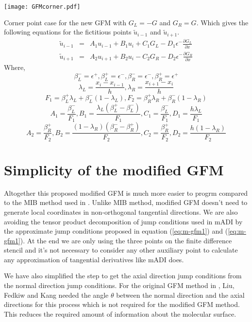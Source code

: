 \begin{center}
	\texttt{[image: GFMcorner.pdf]}\\		
\end{center}
		
Corner point case for the new GFM with $G_L=-G$ and $G_R = G$. 
Which gives the following equations for the fictitious points $\tilde{u}_{i-1}$ and $\tilde{u}_{i+1}$. 
	\begin{eqnarray}
		\tilde{u}_{i-1}&=& A_1 u_{i-1}+B_1 u_{i} + C_1 G_L- D_1 \epsilon^- \frac{\partial G_L}{\partial x} \\
		\tilde{u}_{i+1}&=& A_2 u_{i+1}+B_2 u_{i} - C_2 G_R- D_2 \epsilon^- \frac{\partial G_R}{\partial x}
	\end{eqnarray}
	Where,
	$$\beta_L^-=\epsilon^+,\beta_L^+=\epsilon^-,\beta_R^-=\epsilon^-,\beta_R^+=\epsilon^+$$
	$$\lambda_L=\frac{x_i-x_{i-1}}{h},\lambda_R=\frac{x_{i+1}-x_i}{h}$$
	$$F_1 = \beta^+_L \lambda_L+\beta^-_L(1-\lambda_L), F_2 = \beta^+_R \lambda_R+\beta^-_R(1-\lambda_R)$$
	$$	A_1 = \frac{\beta^-_L}{F_1}, B_1  = \frac{\lambda_L(\beta^+_L-\beta^-_L)}{F_1}, C_1 = \frac{\beta^-_L}{F_1},D_1 = \frac{h \lambda_L}{F_1} $$ %
	$$A_2 = \frac{\beta^+_R}{F_2}, B_2  = \frac{(1-\lambda_R)(\beta^-_R-\beta^+_R)}{F_2}, C_2 = \frac{\beta^+_R}{F_2},D_2 = \frac{h(1- \lambda_R)}{F_2}$$

\section{Simplicity of the modified GFM}

Altogether this proposed modified GFM is much more easier to progrm compared to the MIB method used in \cite{Zhihan2017}. Unlike MIB method, modified GFM doesn't need to generate local coordinates in non-orthogonal tangential directions. We are also avoiding the tensor product decomposition of jump conditions used in mADI\cite{Zhihan2017} by the approximate jump conditions proposed in equation (\ref{eq:m-gfm1}) and (\ref{eq:m-gfm1}). At the end we are only using the three points on the finite difference stencil and it's  not necessary to consider any other auxiliary point to calculate any approximation of tangential derivatives like mADI does.    

We have also simplified the step to get the axial direction jump conditions from the normal direction jump conditions. For the original GFM method in \cite{Liu2000}, Liu, Fedkiw and Kang needed the angle $\theta$ between the normal direction and the axial directions for this process which is not required for the modified GFM method. This reduces the required amount of information about the molecular surface. 